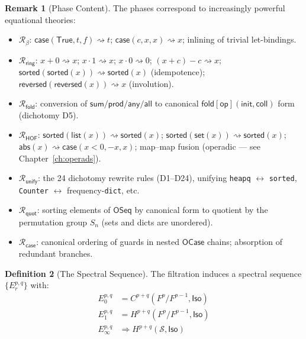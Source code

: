 \documentclass[11pt,a4paper]{report}
\theoremstyle{definition}
\newtheorem{definition}{Definition}[chapter]
\newtheorem{remark}[definition]{Remark}
\theoremstyle{plain}
\newcommand{\fold}{\mathsf{fold}}
\newcommand{\Iso}{\mathsf{Iso}}
\newcommand{\site}{\mathcal{S}}
\begin{document}
\begin{remark}[Phase Content]
The phases correspond to increasingly powerful equational theories:
\begin{itemize}
  \item $\mathcal{R}_\beta$: $\mathsf{case}(\mathsf{True}, t, f)
    \rightsquigarrow t$; $\mathsf{case}(c, x, x) \rightsquigarrow x$;
    inlining of trivial let-bindings.
  \item $\mathcal{R}_\mathsf{ring}$: $x + 0 \rightsquigarrow x$;
    $x \cdot 1 \rightsquigarrow x$; $x \cdot 0 \rightsquigarrow 0$;
    $(x + c) - c \rightsquigarrow x$;
    $\mathsf{sorted}(\mathsf{sorted}(x)) \rightsquigarrow
    \mathsf{sorted}(x)$ (idempotence);
    $\mathsf{reversed}(\mathsf{reversed}(x)) \rightsquigarrow x$
    (involution).
  \item $\mathcal{R}_\mathsf{fold}$: conversion of
    $\mathsf{sum}/\mathsf{prod}/\mathsf{any}/\mathsf{all}$ to
    canonical $\fold[\mathsf{op}](\mathsf{init}, \mathsf{coll})$ form
    (dichotomy D5).
  \item $\mathcal{R}_\mathsf{HOF}$:
    $\mathsf{sorted}(\mathsf{list}(x)) \rightsquigarrow
    \mathsf{sorted}(x)$;
    $\mathsf{sorted}(\mathsf{set}(x)) \rightsquigarrow
    \mathsf{sorted}(x)$;
    $\mathsf{abs}(x) \rightsquigarrow \mathsf{case}(x < 0, -x, x)$;
    map--map fusion (operadic --- see Chapter~\ref{ch:operads}).
  \item $\mathcal{R}_\mathsf{unify}$: the 24 dichotomy rewrite
    rules (D1--D24), unifying \texttt{heapq} $\leftrightarrow$
    \texttt{sorted}, \texttt{Counter} $\leftrightarrow$
    frequency-\texttt{dict}, etc.
  \item $\mathcal{R}_\mathsf{quot}$: sorting elements of
    $\mathsf{OSeq}$ by canonical form to quotient by the permutation
    group $S_n$ (sets and dicts are unordered).
  \item $\mathcal{R}_\mathsf{case}$: canonical ordering of guards
    in nested $\mathsf{OCase}$ chains; absorption of redundant branches.
\end{itemize}
\end{remark}

\begin{definition}[The Spectral Sequence]
The filtration induces a spectral sequence $\{E_r^{p,q}\}$ with:
\begin{align}
  E_0^{p,q} &= C^{p+q}(F^p / F^{p-1}, \Iso) \\
  E_1^{p,q} &= H^{p+q}(F^p / F^{p-1}, \Iso) \\
  E_\infty^{p,q} &\Rightarrow H^{p+q}(\site, \Iso)
\end{align}
\end{definition}
\end{document}
